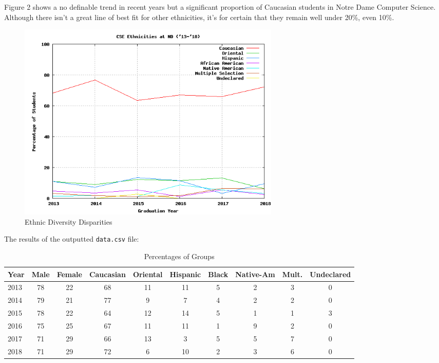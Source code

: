 \documentclass[letterpaper]{article}
\begin{document}
Figure 2 shows a no definable trend in recent years but a significant proportion of Caucasian students in Notre Dame Computer Science. Although there isn't a great line of best fit for other ethnicities, it's for certain that they remain well under 20\%, even 10\%.

\begin{figure}[!htb]
\centering
\includegraphics[width=5in]{race.png}
\caption{Ethnic Diversity Disparities}
\label{fig:race}
\end{figure}

The results of the outputted {\tt data.csv} file:

\begin{table}[h!]
    \centering
    \begin{tabular}{l|c|c|c|c|c|c|c|c|c}
    Year & Male & Female & Caucasian & Oriental & Hispanic & Black & Native-Am & Mult. & Undeclared\\
    \hline
    2013 & 78 & 22 & 68 & 11 & 11 & 5 & 2 & 3 & 0\\ 
    2014 & 79 & 21 & 77 &  9 &  7 & 4 & 2 & 2 & 0\\
    2015 & 78 & 22 & 64 & 12 & 14 & 5 & 1 & 1 & 3\\
    2016 & 75 & 25 & 67 & 11 & 11 & 1 & 9 & 2 & 0\\
    2017 & 71 & 29 & 66 & 13 &  3 & 5 & 5 & 7 & 0\\
    2018 & 71 & 29 & 72 &  6 & 10 & 2 & 3 & 6 & 0
    \end{tabular}
    \caption{Percentages of Groups}
    \label{tbl:example}
\end{table}

\end{document}
